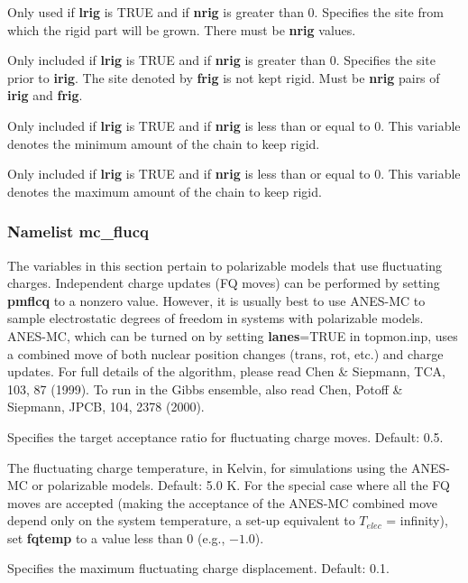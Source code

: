 \documentclass[12pt,letterpaper]{article}
\begin{document}
 Only used if {\bf lrig} is TRUE and if
{\bf nrig} is greater than 0. Specifies the site from which
the rigid part will be grown. There must be \textbf{nrig}
values.

 Only included if {\bf lrig} is TRUE and
if {\bf nrig} is greater than 0. Specifies the site prior to
{\bf irig}. The site denoted by {\bf frig} is not kept
rigid. Must be {\bf nrig} pairs of {\bf irig} and {\bf
  frig}.

 Only included if {\bf lrig} is TRUE
and if {\bf nrig} is less than or equal to 0. This variable
denotes the minimum amount of the chain to keep rigid.

 Only included if {\bf lrig} is TRUE
and if {\bf nrig} is less than or equal to 0. This variable
denotes the maximum amount of the chain to keep rigid.

\subsubsection{Namelist \textbf{mc\_flucq}}

The variables in this section pertain to polarizable models that use
fluctuating charges. Independent charge updates (FQ moves) can
be performed by setting {\bf pmflcq} to a nonzero value. However, it
is usually best to use ANES-MC to sample electrostatic
degrees of freedom in systems with polarizable models.
ANES-MC, which can be turned on by setting {\bf lanes}=TRUE in topmon.inp,
uses a combined move of both nuclear position changes (trans, rot, etc.) 
and charge updates. For full details of the algorithm, please read 
Chen \& Siepmann, TCA, 103, 87 (1999). To run in the Gibbs ensemble,
also read Chen, Potoff \& Siepmann, JPCB, 104, 2378 (2000).

 Specifies the target acceptance ratio
for fluctuating charge moves. Default: 0.5.

 The fluctuating charge temperature,
in Kelvin, for simulations using the ANES-MC or polarizable
models. Default: 5.0 K. For the special case where all the FQ moves 
are accepted (making the acceptance of the ANES-MC combined
move depend only on the system temperature, a set-up
equivalent to $T_{elec}$ = infinity), set {\bf fqtemp} to a value less than 
0 (e.g., $-1.0$).

 Specifies the maximum fluctuating
charge displacement. Default: 0.1.
\end{document}
